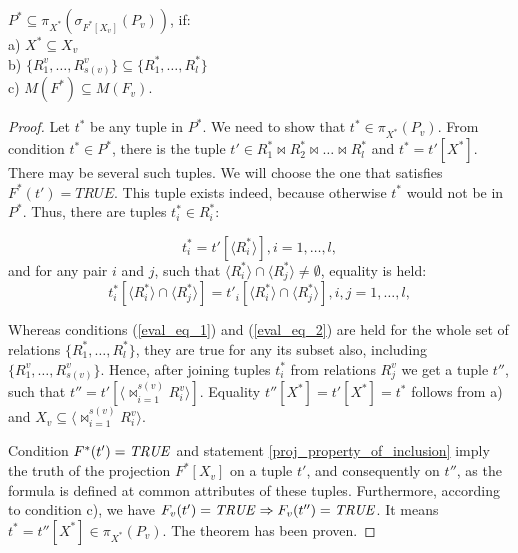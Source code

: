 \begin{theorem}
$P^{\ast} \subseteq \pi_{X^{\ast}} (\sigma_{F^{\ast}[X_v]} (P_{v}))$, if:
\\a) $X^{\ast} \subseteq X_{v}$
\\b) $ \{R^{v}_{1}, \ldots, R^{v}_{s(v)}\} \subseteq \{R^{\ast}_{1}, \ldots,
R^{\ast}_{l}\} $
\\c) $M (F^{\ast}) \subseteq M (F_{v}) $.
\label{th_base}
\end{theorem}
\begin{proof}
Let $t^{\ast}$ be any tuple in $P^{\ast}$. We need to show that
$t^{\ast} \in \pi_{X^{\ast}} (P_{v})$. From condition  $t^{\ast} \in P^{\ast}$,
there is the tuple $t' \in R^{\ast}_1 \Join R^{\ast}_2\Join\ldots
\Join R^{\ast}_l$ and $t^{\ast} = t'[X^{\ast}]$. There may be several such tuples.
We will choose the one that satisfies $F^{\ast}(t')=TRUE$. This tuple exists
indeed, because otherwise $t^{\ast}$ would not be in $P^{\ast}$. Thus, there
are tuples $t^{\ast}_i \in R^{\ast}_i$:

\begin{equation}
t^{\ast}_i = t'[\langle R^{\ast}_i\rangle], i = 1,\dots,l,
\label{eval_eq_1}
\end{equation}
\def \intersecij {\langle R^{\ast}_i \rangle \cap \langle R^{\ast}_j \rangle}
and for any pair $i$ and $j$, such that  $\intersecij \neq \emptyset$, equality is held:
\begin{equation}
t^{\ast}_i[\intersecij] = t'_i[\intersecij], i,j = 1,\dots,l,
\label{eval_eq_2}
\end{equation}

Whereas conditions (\ref{eval_eq_1}) and (\ref{eval_eq_2}) are held for the
whole set of relations $\{R^{\ast}_{1}, \ldots, R^{\ast}_{l}\}$, they are
true for any its subset also, including $\{R^{v}_{1}, \ldots, R^{v}_{s(v)}\}$.
Hence, after joining tuples $t^{\ast}_i$ from relations $R^{v}_j$ we get a tuple
$t''$, such that $t'' = t'[\langle {\Join}_{i=1}^{s(v)} R^v_i \rangle]$.
Equality $t''[X^{\ast}] = t'[X^{\ast}] = t^{\ast}$ follows from a) and $X_v
\subseteq \langle {\Join}_{i=1}^{s(v)} R^v_i \rangle$.

Condition  $F^{\ast}(t') = \mathit{TRUE}$ and statement 
\ref{proj_property_of_inclusion} imply the truth of the projection $F^{\ast}
[X_v]$ on a tuple $t'$, and consequently on $t''$, as the formula is defined at common attributes of these tuples. Furthermore, according to condition c), we have $F_v (t') = \mathit{TRUE} \Rightarrow F_v (t'') = \mathit{TRUE}$.
It means $t^{\ast} = t''[X^{\ast}] \in \pi_{X^{\ast}} (P_{v})$.
The theorem has been proven.
\end{proof}
